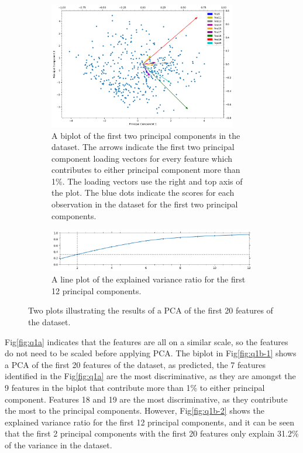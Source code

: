     \begin{figure}[htb]
    \centering
    \begin{subfigure}[b]{0.9\linewidth}
        \includegraphics[width=0.9\textwidth]{figures/q1b-1}
        \caption{A biplot of the first two principal components in the dataset.
        The arrows indicate the first two principal component loading vectors for every feature which contributes to
        either principal component more than 1\%. The loading vectors use the right and top axis of the plot. The blue dots
        indicate the scores for each observation in the dataset for the first two principal components.}
        \label{fig:q1b-1}
    \end{subfigure}
    \hfill
    \begin{subfigure}[b]{0.9\linewidth}
        \includegraphics[width=0.9\linewidth]{figures/q1b-2}
        \caption{A line plot of the explained variance ratio for the first 12 principal components.}
        \label{fig:q1b-2}
    \end{subfigure}
    \caption{Two plots illustrating the results of a PCA of the first 20 features of the 
    dataset.}
    \label{fig:q1b}
    \end{figure}

    Fig\eqref{fig:q1a} indicates that the features are all on a similar scale, so the features do not need to be scaled
    before applying PCA.
    The biplot in Fig\eqref{fig:q1b-1} shows a PCA of the first 20 features of the dataset, as predicted, the 7 features
    identified in the Fig\eqref{fig:q1a} are the most discriminative, as they are amongst the 9 features in the biplot
    that contribute more than 1\% to either principal component.
    Features 18 and 19 are the most discriminative, as they contribute the most to the principal components.
    However, Fig\eqref{fig:q1b-2} shows the explained variance ratio for the first 12 principal components, and it can
    be seen that the first 2 principal components with the first 20 features only explain 31.2\% of the variance in the dataset.
